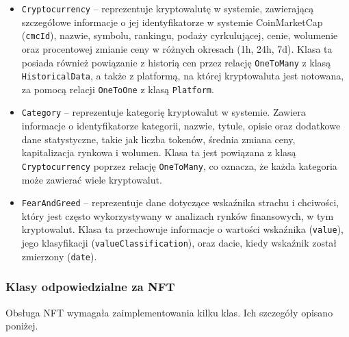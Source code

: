\begin{itemize}
\item \texttt{Cryptocurrency} -- reprezentuje kryptowalutę w systemie, zawierającą szczegółowe informacje o jej identyfikatorze w systemie CoinMarketCap (\texttt{cmcId}), nazwie, symbolu, rankingu, podaży cyrkulującej, cenie, wolumenie oraz procentowej zmianie ceny w różnych okresach (1h, 24h, 7d). Klasa ta posiada również powiązanie z historią cen przez relację \texttt{OneToMany} z klasą \texttt{HistoricalData}, a także z platformą, na której kryptowaluta jest notowana, za pomocą relacji \texttt{OneToOne} z klasą \texttt{Platform}.

\item \texttt{Category} -- reprezentuje kategorię kryptowalut w systemie. Zawiera informacje o identyfikatorze kategorii, nazwie, tytule, opisie oraz dodatkowe dane statystyczne, takie jak liczba tokenów, średnia zmiana ceny, kapitalizacja rynkowa i wolumen. Klasa ta jest powiązana z klasą \texttt{Cryptocurrency} poprzez relację \texttt{OneToMany}, co oznacza, że każda kategoria może zawierać wiele kryptowalut. 

\item \texttt{FearAndGreed} -- reprezentuje dane dotyczące wskaźnika strachu i chciwości, który jest często wykorzystywany w analizach rynków finansowych, w tym kryptowalut. Klasa ta przechowuje informacje o wartości wskaźnika (\texttt{value}), jego klasyfikacji (\texttt{valueClassification}), oraz dacie, kiedy wskaźnik został zmierzony (\texttt{date}).

\end{itemize}

\subsubsection{Klasy odpowiedzialne za NFT}
Obsługa NFT wymagała zaimplementowania kilku klas. Ich szczegóły opisano poniżej.

